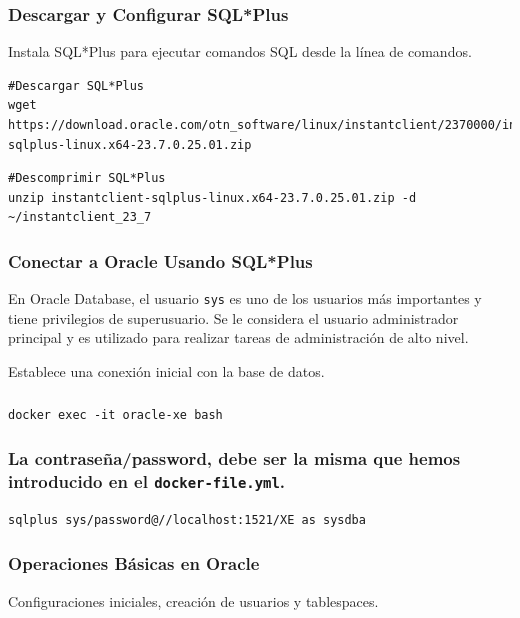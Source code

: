\documentclass{article}
\begin{document}
\subsubsection{Descargar y Configurar SQL*Plus}
Instala SQL*Plus para ejecutar comandos SQL desde la línea de comandos.

\begin{lstlisting}[style=bashStyle]
#Descargar SQL*Plus
wget https://download.oracle.com/otn_software/linux/instantclient/2370000/instantclient-sqlplus-linux.x64-23.7.0.25.01.zip
\end{lstlisting}

\begin{lstlisting}[style=bashStyle]
#Descomprimir SQL*Plus
unzip instantclient-sqlplus-linux.x64-23.7.0.25.01.zip -d ~/instantclient_23_7
\end{lstlisting}

\subsubsection{Conectar a Oracle Usando SQL*Plus}
En Oracle Database, el usuario \texttt{sys} es uno de los usuarios más importantes y tiene privilegios de superusuario. Se le considera el usuario administrador principal y es utilizado para realizar tareas de administración de alto nivel. 

Establece una conexión inicial con la base de datos.

\subsubsection{}
\begin{lstlisting}
docker exec -it oracle-xe bash
\end{lstlisting}

\subsubsection{La contraseña/password, debe ser la misma que hemos introducido en el \texttt{docker-file.yml}.}
\begin{lstlisting}[style=bashStyle]
sqlplus sys/password@//localhost:1521/XE as sysdba
\end{lstlisting}

\subsubsection{Operaciones Básicas en Oracle}
Configuraciones iniciales, creación de usuarios y tablespaces.
\vspace{5mm}
\end{document}
